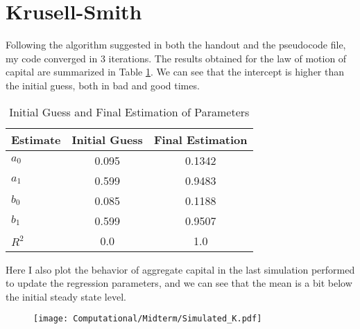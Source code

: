 \documentclass[12pt]{article}
\begin{document}
\section{Krusell-Smith}
Following the algorithm suggested in both the handout and the pseudocode file, my code converged in 3 iterations. The results obtained for the law of motion of capital are summarized in Table \ref{tab:parameter_estimations}. We can see that the intercept is higher than the initial guess, both in bad and good times.
\begin{table}[h!]
\centering
\begin{tabular}{lcc}
\toprule
\textbf{Estimate} & \textbf{Initial Guess} & \textbf{Final Estimation} \\
\midrule
\(a_0\) & 0.095 & 0.1342 \\
\(a_1\) & 0.599 & 0.9483 \\
\(b_0\) & 0.085 & 0.1188 \\
\(b_1\) & 0.599 & 0.9507 \\
\(R^2\) & 0.0   & 1.0   \\
\bottomrule
\end{tabular}
\caption{Initial Guess and Final Estimation of Parameters}
\label{tab:parameter_estimations}
\end{table}
Here I also plot the behavior of aggregate capital in the last simulation performed to update the regression parameters, and we can see that the mean is a bit below the initial steady state level.
\begin{figure}[h!]
    \centering
    \vspace{1cm}
    \texttt{[image: Computational/Midterm/Simulated\_K.pdf]}
\end{figure}
\end{document}
